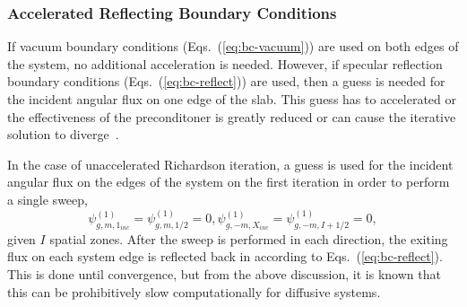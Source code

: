 \subsubsection{Accelerated Reflecting Boundary Conditions}
\label{sec:Transport-RichPow-DSA-Reflect}

\noindent
	\indent If vacuum boundary conditions (Eqs.~(\ref{eq:bc-vacuum})) are used on both edges of the
	system, no additional acceleration is needed.  However, if specular reflection boundary
	conditions (Eqs.~(\ref{eq:bc-reflect})) are used, then a guess is needed for the incident angular
	flux on one edge of the slab.  This guess has to accelerated or the effectiveness of the
	preconditoner is greatly reduced or can cause the iterative solution to diverge~\cite{Yav:88}.  
	
\noindent
	\indent In the case of unaccelerated Richardson iteration, a guess is used for the incident angular
	flux on the edges of the system on the first iteration in order to perform a single sweep,
\begin{subequations}
	\begin{equation}
		 {\psi_{g,m,1_{inc}}^{(1)}} = {\psi_{g,m,1/2}^{(1)}} = 0,
	\end{equation}
	\begin{equation}
		 {\psi_{g,-m,X_{inc}}^{(1)}} = {\psi_{g,-m,I+1/2}^{(1)}} = 0,
	\end{equation}
\end{subequations}
	given ${I}$ spatial zones.  After the sweep is performed in each direction, the exiting flux on each
	system edge is reflected back in according to Eqs.~(\ref{eq:bc-reflect}).  This is done until
	convergence, but from the above discussion, it is known that this can be prohibitively slow
	computationally for diffusive systems.

